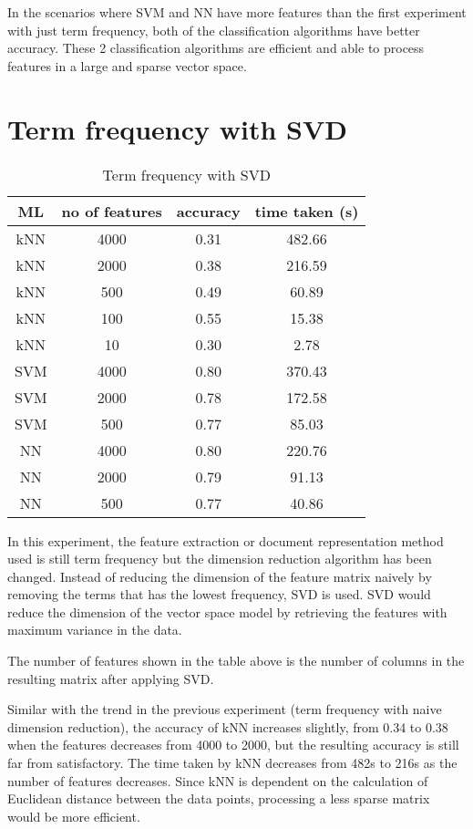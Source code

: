 In the scenarios where SVM and NN have more features than the first experiment with just term frequency, both of the classification algorithms have better accuracy. These 2 classification algorithms are efficient and able to process features in a large and sparse vector space.


\clearpage
\section{Term frequency with SVD}

\begin{table} [ht]
	\centering
	\begin{tabular}{|| c | c | c | c||}
		\hline
		ML & no of features & accuracy & time taken (s) \\ [0.5ex]
		\hline\hline
		kNN & 4000 & 0.31 & 482.66 \\
		\hline
		kNN & 2000 & 0.38 & 216.59 \\ 
		\hline
		kNN & 500 & 0.49 & 60.89 \\ 
		\hline
		kNN & 100 & 0.55 & 15.38 \\ 
		\hline
		kNN & 10 & 0.30 & 2.78 \\ 
		\hline\hline
		SVM & 4000 & 0.80 & 370.43 \\
		\hline
		SVM & 2000 & 0.78 & 172.58 \\
		\hline
		SVM & 500 & 0.77 & 85.03 \\
		\hline\hline
		NN & 4000 & 0.80 & 220.76 \\
		\hline
		NN & 2000 & 0.79 & 91.13 \\
		\hline
		NN & 500 & 0.77 & 40.86 \\
		\hline
	\end{tabular}
\caption{Term frequency with SVD}
\label{tbl:termFrequencySvd}
\end{table}

In this experiment, the feature extraction or document representation method used is still term frequency but the dimension reduction algorithm has been changed. Instead of reducing the dimension of the feature matrix naively by removing the terms that has the lowest frequency, SVD is used. SVD would reduce the dimension of the vector space model by retrieving the features with maximum variance in the data.

The number of features shown in the table above is the number of columns in the resulting matrix after applying SVD.

Similar with the trend in the previous experiment (term frequency with naive dimension reduction), the accuracy of kNN increases slightly, from 0.34 to 0.38 when the features decreases from 4000 to 2000, but the resulting accuracy is still far from satisfactory. The time taken by kNN decreases from 482s to 216s as the number of features decreases. Since kNN is dependent on the calculation of Euclidean distance between the data points, processing a less sparse matrix would be more efficient.

